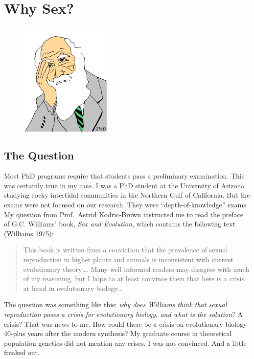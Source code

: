 \documentclass[
  letterpaper,
]{book}
\begin{document}
\hypertarget{sec-why-sex}{%
\chapter{Why Sex?}\label{sec-why-sex}}

\begin{figure}

{\centering \includegraphics[width=0.4\textwidth,height=\textheight]{images/Picture1.png}

}

\end{figure}

\hypertarget{the-question}{%
\section{The Question}\label{the-question}}

Most PhD programs require that students pass a preliminary examination.
This was certainly true in my case. I was a PhD student at the
University of Arizona studying rocky intertidal communities in the
Northern Gulf of California. But the exams were not focused on our
research. They were ``depth-of-knowledge'' exams. My question from
Prof.~Astrid Kodric-Brown instructed me to read the preface of G.C.
Williams' book, \emph{Sex and Evolution}, which contains the following
text (Williams 1975):

\begin{quote}
This book is written from a conviction that the prevalence of sexual
reproduction in higher plants and animals is inconsistent with current
evolutionary theory\ldots. Many well informed readers may disagree with
much of my reasoning, but I hope to at least convince them that here is
a crisis at hand in evolutionary biology\ldots{}
\end{quote}

The question was something like this: \emph{why does Williams think that
sexual reproduction poses a crisis for evolutionary biology, and what is
the solution}? A crisis? That was news to me. How could there be a
crisis on evolutionary biology 40-plus years after the modern synthesis?
My graduate course in theoretical population genetics did not mention
any crises. I was not convinced. And a little freaked out.
\end{document}
